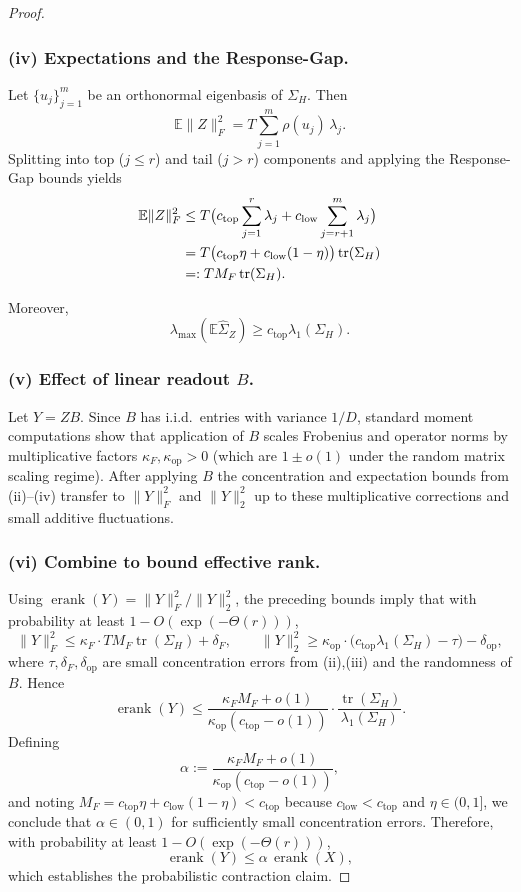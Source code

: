 \documentclass[sigconf,screen]{acmart}
\begin{document}
\begin{proof}
\subsubsection*{\bf (iv) Expectations and the Response-Gap.}  
Let \(\{u_j\}_{j=1}^m\) be an orthonormal eigenbasis of \(\Sigma_H\). Then
\[
\mathbb E\|Z\|_F^2
= T\sum_{j=1}^m \rho(u_j)\,\lambda_j.
\]
Splitting into top (\(j\le r\)) and tail (\(j>r\)) components and applying the Response-Gap bounds yields
\begin{align}
\mathbb E\|Z\|_F^2
&\le T\big(c_{\mathrm{top}}\sum_{j=1}^r\lambda_j + c_{\mathrm{low}}\sum_{j=r+1}^m\lambda_j\big) \notag\\
&= T\big(c_{\mathrm{top}}\eta + c_{\mathrm{low}}(1-\eta)\big)\operatorname{tr}(\Sigma_H) \notag\\
&=: T M_F\operatorname{tr}(\Sigma_H).  \\
\end{align}

Moreover,
\[
\lambda_{\max}(\mathbb E\widehat\Sigma_Z)\ge c_{\mathrm{top}}\lambda_1(\Sigma_H).
\]

\subsubsection*{\bf (v) Effect of linear readout \(B\).}  
Let \(Y=ZB\). Since \(B\) has i.i.d.\ entries with variance \(1/D\), standard moment computations show that application of \(B\) scales Frobenius and operator norms by multiplicative factors \(\kappa_F,\kappa_{\mathrm{op}}>0\) (which are \(1\pm o(1)\) under the random matrix scaling regime). After applying \(B\) the concentration and expectation bounds from (ii)--(iv) transfer to \(\|Y\|_F^2\) and \(\|Y\|_2^2\) up to these multiplicative corrections and small additive fluctuations.

\subsubsection*{\bf (vi) Combine to bound effective rank.}  
Using \(\operatorname{erank}(Y)=\|Y\|_F^2/\|Y\|_2^2\), the preceding bounds imply that with probability at least \(1-O(\exp(-\Theta(r)))\),
\[
\|Y\|_F^2 \le \kappa_F\cdot T M_F\operatorname{tr}(\Sigma_H) + \delta_F,
\qquad
\|Y\|_2^2 \ge \kappa_{\mathrm{op}}\cdot\big(c_{\mathrm{top}}\lambda_1(\Sigma_H)-\tau\big) - \delta_{\mathrm{op}},
\]
where \(\tau,\delta_F,\delta_{\mathrm{op}}\) are small concentration errors from (ii),(iii) and the randomness of \(B\). Hence
\[
\operatorname{erank}(Y)
\le
\frac{\kappa_F M_F + o(1)}{\kappa_{\mathrm{op}}(c_{\mathrm{top}}-o(1))}\cdot
\frac{\operatorname{tr}(\Sigma_H)}{\lambda_1(\Sigma_H)}.
\]
Defining
\[
\alpha := \frac{\kappa_F M_F + o(1)}{\kappa_{\mathrm{op}}(c_{\mathrm{top}}-o(1))},
\]
and noting \(M_F=c_{\mathrm{top}}\eta + c_{\mathrm{low}}(1-\eta) < c_{\mathrm{top}}\) because \(c_{\mathrm{low}}<c_{\mathrm{top}}\) and \(\eta\in(0,1]\), we conclude that \(\alpha\in(0,1)\) for sufficiently small concentration errors. Therefore, with probability at least \(1-O(\exp(-\Theta(r)))\),
\[
\operatorname{erank}(Y)\le \alpha\,\operatorname{erank}(X),
\]
which establishes the probabilistic contraction claim.
\end{proof}
\end{document}
